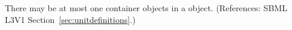 There may be at most one \ListOfUnits container objects in a
\UnitDefinition object.  (References: SBML L3V1
Section~\ref{sec:unitdefinitions}.)
